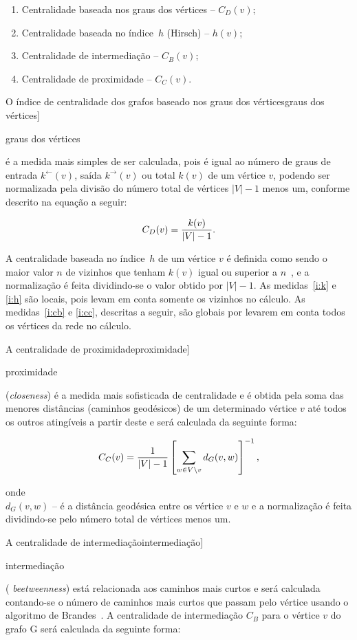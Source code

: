 \documentclass[a4paper,12pt,twoside]{article}
\def\degreelabel{k}
\def\degree#1{\degreelabel(#1)}
\def\degreein#1{\degreelabel^\leftarrow(#1)}
\def\degreeout#1{\degreelabel^\rightarrow(#1)}
\def\vertex{vértice}
\def\hindex{\'indice~$h$}
\renewcommand\marginpar[1]{}
\let\oldmarginpar\marginpar
\renewcommand\marginpar[1]{\-\oldmarginpar[\raggedleft\footnotesize #1]%
{\raggedright\footnotesize #1}}
\begin{document}
\begin{enumerate}
  \item Centralidade baseada nos graus dos \vertex{}s -- $C_D(v)$;\label{i:k}
  \item Centralidade baseada no \hindex{} (Hirsch) -- $h(v)$;\label{i:h}
   \item Centralidade de intermediação -- $C_B(v)$;\label{i:cb}
   \item Centralidade de proximidade -- $C_C(v)$.\label{i:cc}
\end{enumerate}

O índice de centralidade dos grafos baseado nos graus dos
vértices\marginpar{graus dos vértices} é a medida mais simples de ser
calculada, pois é igual ao número de graus de entrada $\degreein{v}$, saída
$\degreeout{v}$ ou total $\degree{v}$ de um vértice $v$, podendo ser normalizada
pela divisão do número total de vértices $|V|-1$ menos um, conforme
descrito na equação a seguir:

\begin{displaymath}
C_D(v) = { \degree{v} \over |V| -1 }.
\end{displaymath}

A centralidade baseada no \hindex{} de um \vertex{} $v$ é definida
como sendo o maior valor $n$ de vizinhos que tenham $\degree{v}$ igual
ou superior a $n$~\cite{arxvi:h, zhao2011}, e a normalização é feita dividindo-se
o valor obtido por $|V|-1$. As medidas~\ref{i:k} e \ref{i:h} são
locais, pois levam em conta somente os vizinhos no cálculo. As
medidas~\ref{i:cb} e \ref{i:cc}, descritas a seguir, são globais por
levarem em conta todos os vértices da rede no cálculo.

A centralidade de proximidade\marginpar{proximidade} ({\em closeness\/})
é a medida mais sofisticada de centralidade e é obtida pela soma das
menores distâncias (caminhos geodésicos) de um determinado vértice $v$ até todos os outros
atingíveis a partir deste e será calculada da seguinte forma:

\begin{displaymath}
  C_C(v) = {1 \over |V|-1} \left[\sum_{w\in V\setminus v}d_G(v,w)\right]^{-1},
\end{displaymath}

\noindent onde\\
$d_G(v,w)$ -- é a distância geodésica entre os vértice $v$ e $w$ e
a normalização é feita dividindo-se pelo número total de vértices
menos um.

A centralidade de intermediação\marginpar{intermediação} ({\em
  beetweenness\/}) está relacionada aos caminhos mais curtos e será
calculada contando-se o número de caminhos mais curtos que passam pelo
vértice usando o algoritmo de Brandes~\cite{brandes2001}.  A
centralidade de intermediação $C_B$ para o vértice $v$ do grafo G será
calculada da seguinte forma:
\end{document}
